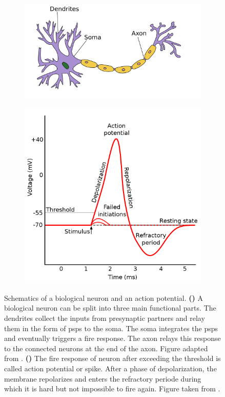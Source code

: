 \begin{figure}
	\begin{subfigure}{0.5\textwidth}
		\centering
		\caption{}
		\vspace{0.75cm}
		\includegraphics[width=\linewidth, valign=t]{figures/Neuron.pdf}
		\vspace{1.25cm}	
		\label{biosynapse}
	\end{subfigure}
	\begin{subfigure}{0.5\textwidth}
		\centering
		\caption{}
		\includegraphics[width=0.8\linewidth, valign=t]{figures/action_potential.png}
		\label{actionpotential}
	\end{subfigure}
	\caption[Schematics of a biological neuron and an action potential]{Schematics of a biological neuron and an action potential. \textbf{()} A biological neuron can be split into three main functional parts. The dendrites collect the inputs from presynaptic partners and relay them in the form of \glspl{psp} to the soma. The soma integrates the \glspl{psp} and eventually triggers a fire response. The axon relays this response to the connected neurons at the end of the axon. Figure adapted from \citealp{picture_neuron}. \textbf{()} The fire response of neuron after exceeding the threshold is called action potential or spike. After a phase of depolarization, the membrane repolarizes and enters the refractory periode during which it is hard but not impossible to fire again. Figure taken from \citealp{picture_actionpotential}.}
	\label{biologicalneuron}
	
\end{figure}

